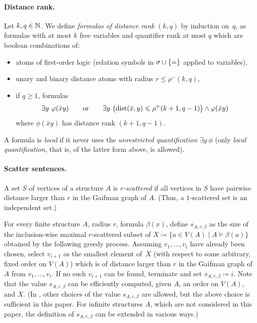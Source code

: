 \paragraph{Distance rank.}
Let \(k,q \in \mathbb N\).
We define \emph{\distFO formulas of distance rank} \((k,q)\) by induction on~$q$,
as formulas with at most $k$ free variables and
quantifier rank at most $q$ which are boolean combinations of:
\begin{itemize}
    \item atoms of first-order logic (relation symbols in $\sigma\cup\{=\}$ applied to variables),
    \item unary and binary distance atoms with radius  \(r\le \rho^-(k,q)\),
    \item if $q\ge 1$, formulas
        \[
            \exists y~\varphi(\bar x y)
            \quad\quad\text{or}\quad\quad
            \exists y~\bigl(\mathrm{dist}(\bar x,y) \leqslant \rho^+(k+1,q-1)\bigr) \land \varphi(\bar x y)
        \]
        where \(\phi(\bar x y)\) has distance rank \((k+1,q-1)\).
\end{itemize}
A \distFO formula is \emph{local}
if it never uses the \emph{unrestricted quantification} $\exists y~\phi$
(only \emph{local quantification}, that is, of the latter form above, is allowed).

\paragraph{Scatter sentences.}
A set \(S\) of vertices of a structure $A$ is \emph{\(r\)-scattered} if all vertices in \(S\)
have pairwise distance larger than \(r\) in the Gaifman graph of $A$. (Thus, a \(1\)-scattered set is an independent set.)

For every finite structure $A$, radius \(r\), formula \(\beta(x)\), 
define $s_{A,r,\beta}$ as the size of the inclusion-wise maximal $r$-scattered subset 
of \(X\coloneqq\{ a \in V(A) \mid A \models \beta(a)\}\) obtained by the following greedy process.
Assuming \(v_1,\dots,v_i\) have already been chosen, select \(v_{i+1}\) as the smallest element of~$X$ (with respect to some arbitrary, fixed order on \(V(A)\))
 which is of distance larger than \(r\) in the Gaifman graph of $A$ from \(v_1,\dots,v_i\).
If no such \(v_{i+1}\) can be found, terminate and set $s_{A,r,\beta} \coloneqq i$.
Note that the value $s_{A,r,\beta}$ can be efficiently computed,
given $A$, an order on $V(A)$, and $X$.
(In \cite{locality-note}, other choices of the value $s_{A,r,\beta}$ are allowed, but the above choice is sufficient in this paper. For infinite structures $A$, which are not considered in this paper, the definition of $s_{A,r,\beta}$ can be extended in various ways.)


